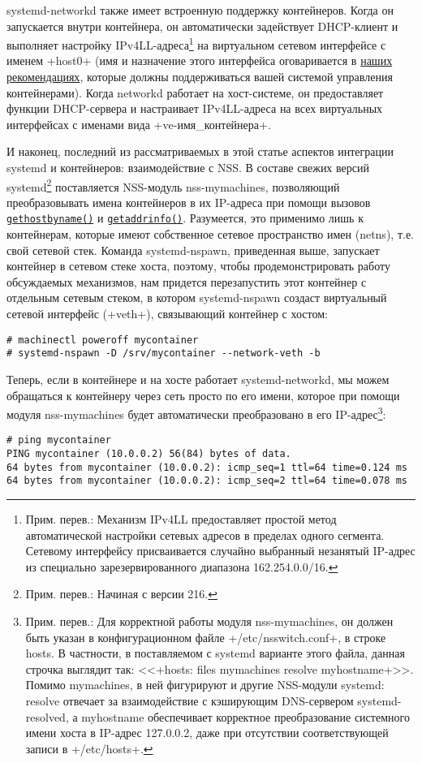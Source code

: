 \documentclass[10pt,oneside,a4paper]{article}
\newcommand{\hreftt}[2]{\href{#1}{\texttt{#2}}}
\begin{document}
systemd-networkd также имеет встроенную поддержку контейнеров. Когда он
запускается внутри контейнера, он автоматически задействует DHCP-клиент и
выполняет настройку IPv4LL-адреса\footnote{Прим. перев.: Механизм IPv4LL
предоставляет простой метод автоматической настройки сетевых адресов в пределах
одного сегмента. Сетевому интерфейсу присваивается случайно выбранный незанятый
IP-адрес из специально зарезервированного диапазона 162.254.0.0/16.} на
виртуальном сетевом интерфейсе с именем +host0+ (имя и назначение этого
интерфейса оговаривается в
\href{http://www.freedesktop.org/wiki/Software/systemd/ContainerInterface/}{наших
рекомендациях}, которые должны поддерживаться вашей системой управления
контейнерами). Когда networkd работает на хост-системе, он
предоставляет функции DHCP-сервера и настраивает IPv4LL-адреса на всех
виртуальных интерфейсах с именами вида +ve-имя_контейнера+.

И наконец, последний из рассматриваемых в этой статье аспектов интеграции
systemd и контейнеров: взаимодействие с NSS. В составе свежих версий
systemd\footnote{Прим.  перев.: Начиная с версии 216.} поставляется NSS-модуль
nss-mymachines, позволяющий преобразовывать имена контейнеров в их IP-адреса
при помощи вызовов
\hreftt{http://man7.org/linux/man-pages/man3/gethostbyname.3.html}{gethostbyname()}
и
\hreftt{http://man7.org/linux/man-pages/man3/getaddrinfo.3.html}{getaddrinfo()}.
Разумеется, это применимо лишь к контейнерам, которые имеют собственное сетевое
пространство имен (netns), т.е. свой сетевой стек. Команда systemd-nspawn,
приведенная выше, запускает контейнер в сетевом стеке хоста, поэтому, чтобы
продемонстрировать работу обсуждаемых механизмов, нам придется перезапустить
этот контейнер с отдельным сетевым стеком, в котором systemd-nspawn создаст
виртуальный сетевой интерфейс (+veth+), связывающий контейнер с хостом:
\begin{Verbatim}
# machinectl poweroff mycontainer
# systemd-nspawn -D /srv/mycontainer --network-veth -b
\end{Verbatim}

Теперь, если в контейнере и на хосте работает systemd-networkd, мы можем
обращаться к контейнеру через сеть просто по его имени, которое при помощи
модуля nss-mymachines будет автоматически преобразовано в его
IP-адрес\footnote{Прим. перев.: Для корректной работы модуля nss-mymachines,
он должен быть указан в конфигурационном файле +/etc/nsswitch.conf+, в строке
hosts. В частности, в поставляемом с systemd варианте этого файла, данная
строчка выглядит так: <<+hosts: files mymachines resolve myhostname+>>. Помимо
mymachines, в ней фигурируют и другие NSS-модули systemd: resolve отвечает
за взаимодействие с кэширующим DNS-сервером systemd-resolved, а myhostname
обеспечивает корректное преобразование системного имени хоста в IP-адрес
127.0.0.2, даже при отсутствии соответствующей записи в +/etc/hosts+.}:
\begin{Verbatim}
# ping mycontainer
PING mycontainer (10.0.0.2) 56(84) bytes of data.
64 bytes from mycontainer (10.0.0.2): icmp_seq=1 ttl=64 time=0.124 ms
64 bytes from mycontainer (10.0.0.2): icmp_seq=2 ttl=64 time=0.078 ms
\end{Verbatim}
\end{document}
